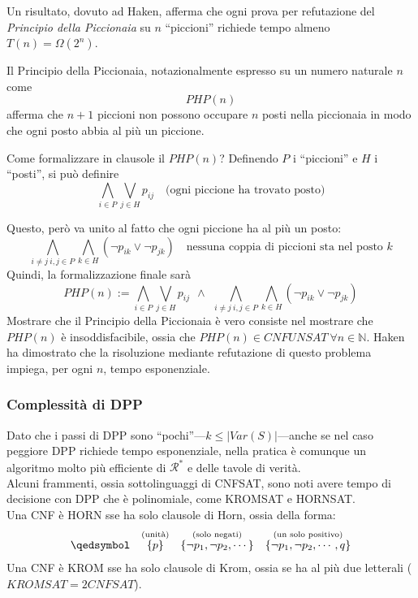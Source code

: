 Un risultato, dovuto ad Haken, afferma che ogni prova per refutazione del 
\textit{Principio della Piccionaia} su $n$ ``piccioni''
richiede tempo almeno $T(n) = \Omega(2^n)$. 


\begin{defi}
        Il Principio della Piccionaia, notazionalmente espresso su un 
        numero naturale $n$ come 
        $$
        PHP(n)
        $$
        afferma che $n+1$ piccioni non possono occupare 
        $n$ posti nella piccionaia in modo che ogni posto abbia al più un 
        piccione. 
\end{defi}

Come formalizzare in clausole il $PHP(n)$? Definendo $P$ i ``piccioni'' e 
$H$ i ``posti'', si può definire
$$
\bigwedge_{i \in P} \bigvee_{j \in H} p_{ij} ~~~ \text{ (ogni piccione ha trovato posto)}
$$

Questo, però va unito al fatto che ogni piccione ha al più un posto: 
$$
\bigwedge_{i \neq j ~ i,j \in P}\bigwedge_{k \in H} (\neg p_{ik} \lor \neg p_{jk}) ~~~ \text{ nessuna coppia di piccioni sta nel posto }k 
$$
Quindi, la formalizzazione finale sarà 
$$
PHP(n) := \bigwedge_{i \in P} \bigvee_{j \in H} p_{ij} ~~ \land ~~ \bigwedge_{i \neq j ~ i,j \in P}\bigwedge_{k \in H} (\neg p_{ik} \lor \neg p_{jk})
$$
Mostrare che il Principio della Piccionaia è vero consiste nel mostrare che 
$PHP(n)$ è insoddisfacibile, ossia che $PHP(n) \in CNFUNSAT\ \forall n \in \mathbb{N}$. 
Haken ha dimostrato che la risoluzione mediante refutazione di questo problema impiega, per ogni $n$, tempo esponenziale.  

\subsubsection{Complessità di DPP}
Dato che i passi di DPP sono ``pochi''—$k \leq |Var(S)|$—anche se nel caso 
peggiore DPP richiede tempo esponenziale, nella pratica è comunque un 
algoritmo molto più efficiente di $\mathscr{R}^*$ e delle tavole di verità. \\
Alcuni frammenti, ossia sottolinguaggi di CNFSAT, sono noti avere tempo di decisione con DPP che è polinomiale, come KROMSAT e HORNSAT. \\
Una CNF è HORN sse ha solo clausole di Horn, ossia della forma:
\begin{align*}
  \qedsymbol &&
  \stackrel{\text{(unità)}}{\{p\}} &&
  \stackrel{\text{(solo negati)}}{\{\neg p_1, \neg p_2, \cdots\}} &&
  \stackrel{\text{(un solo positivo)}}{\{\neg p_1, \neg p_2, \cdots, q\}}
\end{align*}
Una CNF è KROM sse ha solo clausole di Krom, ossia se ha al più due letterali ($KROMSAT = 2CNFSAT$). 

